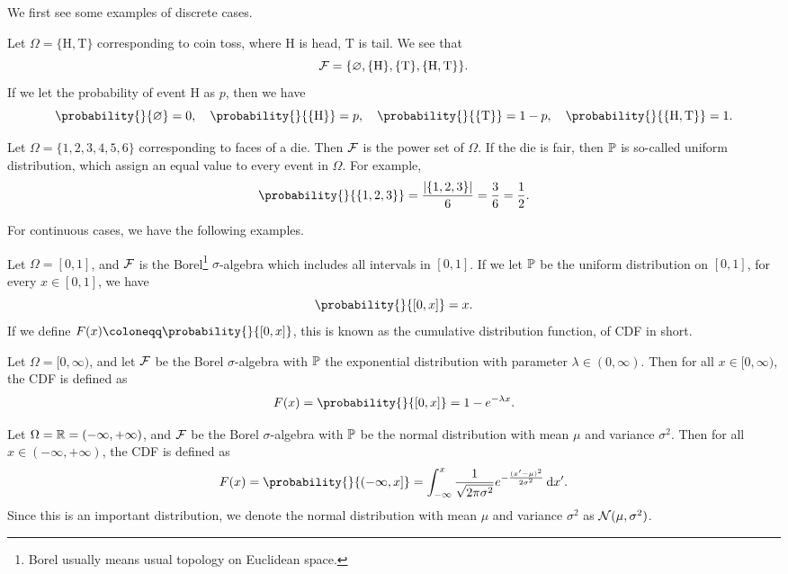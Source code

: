 We first see some examples of discrete cases.
\begin{eg}
	Let \(\Omega = \{\mathrm{H}, \mathrm{T}\}\) corresponding to coin toss, where \(\mathrm{H}\) is head, \(\mathrm{T}\) is tail. We see that
	\[
		\mathcal{\MakeUppercase{f}} = \{\varnothing , \{\mathrm{H} \}, \{\mathrm{T} \}, \{\mathrm{H} , \mathrm{T} \}\}.
	\]
	If we let the probability of event \(\mathrm{H} \) as \(p\), then we have
	\[
		\probability{}{\varnothing } = 0,\quad \probability{}{\{\mathrm{H}\}} = p,\quad \probability{}{\{\mathrm{T} \}} = 1 - p,\quad \probability{}{\{\mathrm{H} , \mathrm{T} \}} = 1.
	\]
\end{eg}

\begin{eg}
	Let \(\Omega = \{1, 2, 3, 4, 5, 6\}\) corresponding to faces of a die. Then \(\mathcal{\MakeUppercase{f}} \) is the power set of \(\Omega \). If the die is fair, then
	\(\mathbb{\MakeUppercase{p}} \) is so-called uniform distribution, which assign an equal value to every event in \(\Omega \). For example,
	\[
		\probability{}{\{1, 2, 3\}} = \frac{\left\vert \{1, 2, 3\} \right\vert }{6} = \frac{3}{6} = \frac{1}{2}.
	\]
\end{eg}

For continuous cases, we have the following examples.
\begin{eg}
	Let \(\Omega = [0, 1]\), and \(\mathcal{\MakeUppercase{f}}\) is the Borel\footnote{Borel usually means usual topology on Euclidean space.} \(\sigma \)-algebra which includes all intervals in \([0, 1]\).
	If we let \(\mathbb{\MakeUppercase{p}} \) be the uniform distribution on \([0, 1]\), for every \(x\in [0, 1]\), we have
	\[
		\probability{}{[0, x]} = x.
	\]
	If we define \(F(x)\coloneqq \probability{}{[0, x]} \), this is known as the cumulative distribution function, of CDF in short.
\end{eg}

\begin{eg}
	Let \(\Omega = [0, \infty )\), and let \(\mathcal{\MakeUppercase{f}} \) be the Borel \(\sigma \)-algebra with \(\mathbb{\MakeUppercase{p}} \) the
	exponential distribution with parameter \(\lambda \in (0, \infty )\). Then for all \(x\in [0, \infty )\), the CDF is defined as
	\[
		F(x) = \probability{}{[0, x]} = 1 - e^{-\lambda x}.
	\]
\end{eg}

\begin{eg}
	Let \(\Omega = \mathbb{\MakeUppercase{r}} = (-\infty , +\infty )\), and \(\mathcal{\MakeUppercase{f}} \) be the Borel \(\sigma \)-algebra with \(\mathbb{\MakeUppercase{p}} \)
	be the normal distribution with mean \(\mu \) and variance \(\sigma ^{2} \). Then for all \(x\in (-\infty , +\infty )\), the CDF is defined as
	\[
		F(x) = \probability{}{(-\infty , x]} = \int_{-\infty}^{x} \frac{1}{\sqrt{2\pi \sigma ^{2} } } e^{- \frac{(x^\prime  - \mu )^{2} }{2 \sigma ^{2} }} \,\mathrm{d}x^\prime.
	\]
	Since this is an important distribution, we denote the normal distribution with mean \(\mu\) and variance \(\sigma ^{2} \) as \(\mathcal{\MakeUppercase{n}} (\mu , \sigma ^{2} )\).
\end{eg}

